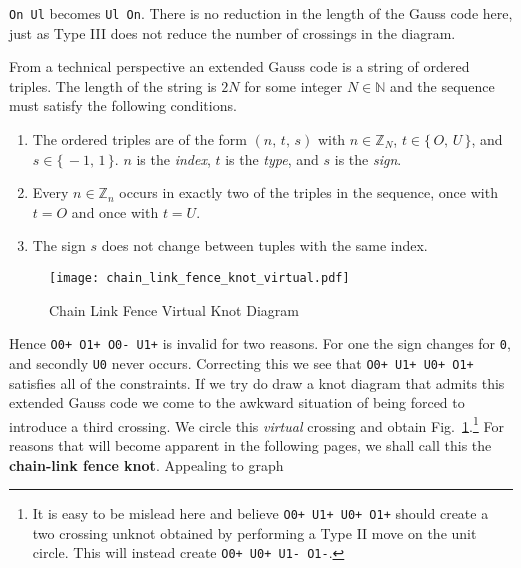         \texttt{On Ul} becomes \texttt{Ul On}. There is no reduction in the
        length of the Gauss code here, just as Type III does not reduce the
        number of crossings in the diagram.
        \par\hfill\par
        From a technical perspective an extended Gauss code is a string of
        ordered triples. The length of the string is $2N$ for some integer
        $N\in\mathbb{N}$ and the sequence must satisfy the following
        conditions.
        \begin{enumerate}
            \item
                The ordered triples are of the form $(n,\,t,\,s)$ with
                $n\in\mathbb{Z}_{N}$, $t\in\{\,O,\,U\,\}$, and
                $s\in\{\,-1,\,1\,\}$. $n$ is the \textit{index}, $t$ is the
                \textit{type}, and $s$ is the \textit{sign}.
            \item
                Every $n\in\mathbb{Z}_{n}$ occurs in exactly two of the
                triples in the sequence, once with $t=O$ and once with
                $t=U$.
            \item
                The sign $s$ does not change between tuples with the same
                index.
        \end{enumerate}
        \begin{figure}
            \centering
            \texttt{[image: chain\_link\_fence\_knot\_virtual.pdf]}
            \caption{Chain Link Fence Virtual Knot Diagram}
            \label{fig:chain_link_fence_knot_virtual}
        \end{figure}
        Hence \texttt{O0+ O1+ O0- U1+} is invalid for two reasons. For one
        the sign changes for \texttt{0}, and secondly \texttt{U0} never occurs.
        Correcting this we see that \texttt{O0+ U1+ U0+ O1+} satisfies all of
        the constraints. If we try do draw a knot diagram that admits this
        extended Gauss code we come to the awkward situation of being forced
        to introduce a third crossing. We circle this \textit{virtual} crossing
        and obtain Fig.~\ref{fig:chain_link_fence_knot_virtual}.\footnote{%
            It is easy to be mislead here and believe
            \texttt{O0+ U1+ U0+ O1+} should create a two crossing unknot
            obtained by performing a Type II move on the unit circle. This will
            instead create \texttt{O0+ U0+ U1- O1-}.
        }
        For reasons that will become apparent in the following pages, we shall
        call this the \textbf{chain-link fence knot}. Appealing to graph
